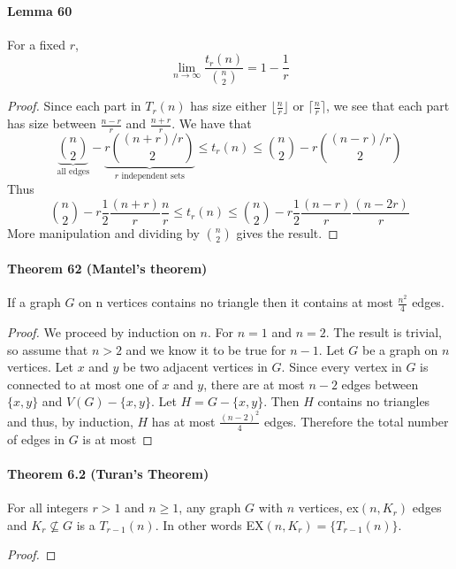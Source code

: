 \paragraph{Lemma 60} For a fixed $ r $, 
$$ \lim_{n\to\infty} \frac{t_r(n)}{\binom{n}{2}} = 1 - \frac{1}{r}$$
\begin{proof}
    Since each part in $ T_r(n) $ has size either $\lfloor\frac{n}{r}\rfloor$
    or $\lceil\frac{n}{r}\rceil$, we see that each part has size between
    $ \frac{n-r}{r}$ and $ \frac{n+r}{r}$. We have that 
    $$ \underbrace{\binom{n}{2}}_{\text{all edges}} - 
    \underbrace{r \binom{(n+r)/r}{2}}_{r \text{ independent sets}} 
    \leq t_r(n) \leq \binom{n}{2} - r\binom{(n-r)/r}{2} $$
    Thus 
    $$ \binom{n}{2} - r \frac{1}{2}\frac{(n+r)}{r}\frac{n}{r}
    \leq t_r(n) \leq \binom{n}{2} - r \frac{1}{2}\frac{(n-r)}{r}\frac{(n-2r)}{r} 
    $$
    More manipulation and dividing by $ \binom{n}{2} $ gives the result.
\end{proof}

\paragraph{Theorem 62 (Mantel's theorem)} If a graph $ G $ on n vertices contains 
no triangle then it contains at most $ \frac{n^2}{4} $ edges.
\begin{proof} 
    We proceed by induction on $ n $. For $ n = 1 $ and $ n = 2$. The result 
    is trivial, so assume that $ n > 2 $ and we know it to be true for $ n - 1$.
    Let $ G $ be a graph on $ n $ vertices. Let $ x $ and $ y $ be two adjacent vertices
    in $ G $. Since every vertex in $ G $ is connected to at most one of $ x $ and $ y$, 
    there are at most $ n - 2 $ edges between $ \{x,y\} $ and $ V(G) - \{x,y\} $. 
    Let $ H = G - \{x,y\}$. Then $ H $ contains no triangles and thus, by induction, 
    $ H $ has at most $ \frac{(n - 2)^2}{4} $ edges. Therefore the total number 
    of edges in $ G $ is at most

\end{proof}

\paragraph{Theorem 6.2 (Turan's Theorem)} For all integers $ r > 1 $ and $ n \geq 1$,
any graph $ G $ with $ n $ vertices, ex$(n,K_r)$ edges and $ K_r \nsubseteq G $ 
is a $ T_{r-1}(n) $. In other words EX$(n,K_r) = \{T_{r-1}(n)\}$.
\begin{proof}
       {\color{red}{TODO}}
\end{proof}

